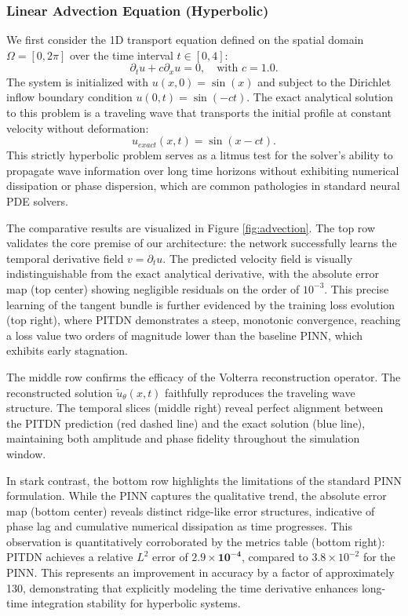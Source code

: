 \documentclass[11pt,reqno]{amsart}
\theoremstyle{plain}
\theoremstyle{definition}
\theoremstyle{remark}
\begin{document}
\subsubsection{Linear Advection Equation (Hyperbolic)}
We first consider the 1D transport equation defined on the spatial domain $\Omega = [0, 2\pi]$ over the time interval $t \in [0, 4]$:
\begin{equation}
    \partial_t u + c \partial_x u = 0, \quad \text{with } c = 1.0.
\end{equation}
The system is initialized with $u(x,0) = \sin(x)$ and subject to the Dirichlet inflow boundary condition $u(0,t) = \sin(-ct)$. The exact analytical solution to this problem is a traveling wave that transports the initial profile at constant velocity without deformation:
\begin{equation}
    u_{exact}(x,t) = \sin(x - ct).
\end{equation}
This strictly hyperbolic problem serves as a litmus test for the solver's ability to propagate wave information over long time horizons without exhibiting numerical dissipation or phase dispersion, which are common pathologies in standard neural PDE solvers.

The comparative results are visualized in Figure \ref{fig:advection}. The {top row} validates the core premise of our architecture: the network successfully learns the temporal derivative field $v = \partial_t u$. The predicted velocity field is visually indistinguishable from the exact analytical derivative, with the absolute error map (top center) showing negligible residuals on the order of $10^{-3}$. This precise learning of the tangent bundle is further evidenced by the training loss evolution (top right), where PITDN demonstrates a steep, monotonic convergence, reaching a loss value two orders of magnitude lower than the baseline PINN, which exhibits early stagnation.

The {middle row} confirms the efficacy of the Volterra reconstruction operator. The reconstructed solution $\tilde{u}_\theta(x,t)$ faithfully reproduces the traveling wave structure. The temporal slices (middle right) reveal perfect alignment between the PITDN prediction (red dashed line) and the exact solution (blue line), maintaining both amplitude and phase fidelity throughout the simulation window.

In stark contrast, the {bottom row} highlights the limitations of the standard PINN formulation. While the PINN captures the qualitative trend, the absolute error map (bottom center) reveals distinct ridge-like error structures, indicative of phase lag and cumulative numerical dissipation as time progresses. This observation is quantitatively corroborated by the metrics table (bottom right): PITDN achieves a relative $L^2$ error of $\mathbf{2.9 \times 10^{-4}}$, compared to $3.8 \times 10^{-2}$ for the PINN. This represents an improvement in accuracy by a factor of approximately 130, demonstrating that explicitly modeling the time derivative enhances long-time integration stability for hyperbolic systems.
\end{document}
